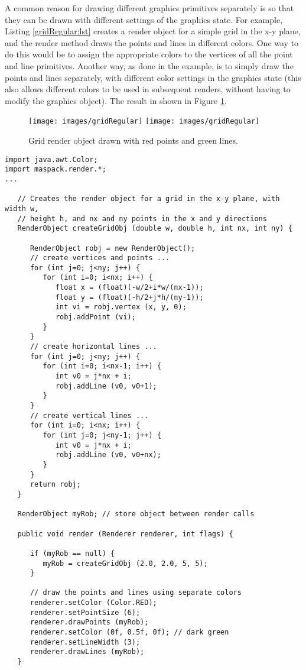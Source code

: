A common reason for drawing different graphics primitives separately
is so that they can be drawn with different settings of the graphics
state. For example, Listing \ref{gridRegular:lst} creates a render
object for a simple grid in the x-y plane, and the render method draws the
points and lines in different colors. One way to do this would be to
assign the appropriate colors to the vertices of all the point and
line primitives.  Another way, as done in the example, is to simply
draw the points and lines separately, with different color settings in
the graphics state (this also allows different colors to be used in
subsequent renders, without having to modify the graphics object).
The result in shown in Figure \ref{gridRegular:fig}.
%
\begin{figure}[t]
\begin{center}
\iflatexml
 \texttt{[image: images/gridRegular]}
\else
 \texttt{[image: images/gridRegular]}
\fi
\end{center}
\caption{Grid render object drawn with red points and green lines.}
\label{gridRegular:fig}
\end{figure}
%
%
\begin{lstlisting}[caption={Building and drawing render object for a grid.},
label=gridRegular:lst]
import java.awt.Color;
import maspack.render.*;
...

   // Creates the render object for a grid in the x-y plane, with width w, 
   // height h, and nx and ny points in the x and y directions
   RenderObject createGridObj (double w, double h, int nx, int ny) {
      
      RenderObject robj = new RenderObject();
      // create vertices and points ...
      for (int j=0; j<ny; j++) {
         for (int i=0; i<nx; i++) {
            float x = (float)(-w/2+i*w/(nx-1));
            float y = (float)(-h/2+j*h/(ny-1));
            int vi = robj.vertex (x, y, 0);
            robj.addPoint (vi);
         }
      }
      // create horizontal lines ...
      for (int j=0; j<ny; j++) {
         for (int i=0; i<nx-1; i++) {
            int v0 = j*nx + i;
            robj.addLine (v0, v0+1);
         }
      }
      // create vertical lines ...
      for (int i=0; i<nx; i++) {
         for (int j=0; j<ny-1; j++) {
            int v0 = j*nx + i;
            robj.addLine (v0, v0+nx);
         }
      }
      return robj;         
   }
   
   RenderObject myRob; // store object between render calls
   
   public void render (Renderer renderer, int flags) {
   
      if (myRob == null) {
         myRob = createGridObj (2.0, 2.0, 5, 5);
      }
   
      // draw the points and lines using separate colors
      renderer.setColor (Color.RED);
      renderer.setPointSize (6);
      renderer.drawPoints (myRob);
      renderer.setColor (0f, 0.5f, 0f); // dark green
      renderer.setLineWidth (3);
      renderer.drawLines (myRob);
   }
\end{lstlisting}
